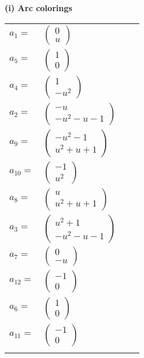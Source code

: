 \documentclass[1p]{elsarticle_modified}
\theoremstyle{definition}
\begin{document}
\flushleft \textbf{(i) Arc colorings}\\
\begin{tabular}{m{7pt} m{180pt} m{7pt} m{180pt} }
\flushright $a_{1}=$&$\begin{pmatrix}0\\u\end{pmatrix}$ \\
\flushright $a_{5}=$&$\begin{pmatrix}1\\0\end{pmatrix}$ \\
\flushright $a_{4}=$&$\begin{pmatrix}1\\- u^2\end{pmatrix}$ \\
\flushright $a_{2}=$&$\begin{pmatrix}- u\\- u^2- u-1\end{pmatrix}$ \\
\flushright $a_{9}=$&$\begin{pmatrix}- u^2-1\\u^2+u+1\end{pmatrix}$ \\
\flushright $a_{10}=$&$\begin{pmatrix}-1\\u^2\end{pmatrix}$ \\
\flushright $a_{8}=$&$\begin{pmatrix}u\\u^2+u+1\end{pmatrix}$ \\
\flushright $a_{3}=$&$\begin{pmatrix}u^2+1\\- u^2- u-1\end{pmatrix}$ \\
\flushright $a_{7}=$&$\begin{pmatrix}0\\- u\end{pmatrix}$ \\
\flushright $a_{12}=$&$\begin{pmatrix}-1\\0\end{pmatrix}$ \\
\flushright $a_{6}=$&$\begin{pmatrix}1\\0\end{pmatrix}$ \\
\flushright $a_{11}=$&$\begin{pmatrix}-1\\0\end{pmatrix}$\\&\end{tabular}
\end{document}
